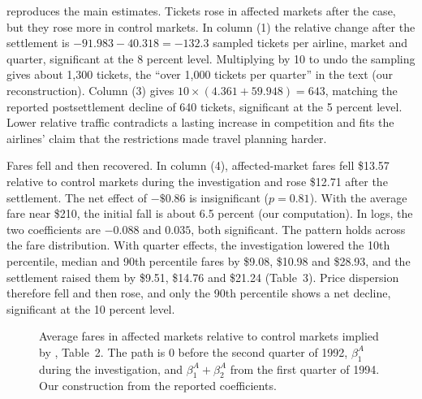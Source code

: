  reproduces the main estimates. Tickets rose in affected markets after the case, but they
rose more in control markets. In column (1) the relative change after the settlement is
$-91.983 - 40.318 = -132.3$ sampled tickets per airline, market and quarter, significant at the 8 percent level.
Multiplying by 10 to undo the sampling gives about 1,300 tickets, the ``over 1,000 tickets per quarter'' in the
text (our reconstruction). Column (3) gives $10 \times (4.361 + 59.948) = 643$, matching the reported
postsettlement decline of 640 tickets, significant at the 5 percent level. Lower relative traffic contradicts a
lasting increase in competition and fits the airlines' claim that the restrictions made travel planning harder.

Fares fell and then recovered. In column (4), affected-market fares fell \$13.57 relative to control markets
during the investigation and rose \$12.71 after the settlement. The net effect of $-\$0.86$ is insignificant
($p = 0.81$). With the average fare near \$210, the initial fall is about 6.5 percent (our computation). In logs,
the two coefficients are $-0.088$ and $0.035$, both significant. The pattern holds across the fare distribution.
With quarter effects, the investigation lowered the 10th percentile, median and 90th percentile fares by \$9.08,
\$10.98 and \$28.93, and the settlement raised them by \$9.51, \$14.76 and \$21.24 (Table~3). Price dispersion
therefore fell and then rose, and only the 90th percentile shows a net decline, significant at the 10 percent
level.

\begin{figure}[htbp]
\centering
{}
\caption{Average fares in affected markets relative to control markets implied by
\citet{Miller2010}, Table~2. The path is 0 before the second quarter of 1992, $\beta^{A}_1$ during the
investigation, and $\beta^{A}_1 + \beta^{A}_2$ from the first quarter of 1994. Our construction from the reported
coefficients.}\label{fig:13-miller-path}
\end{figure}

